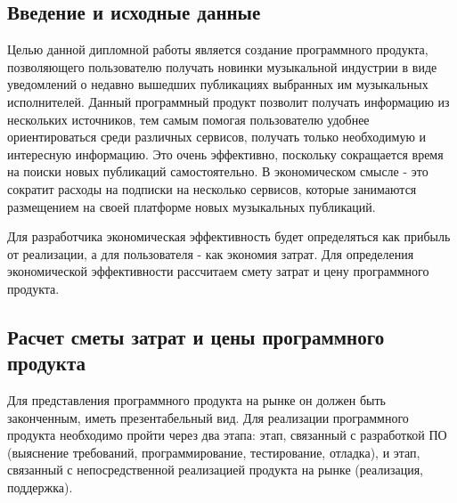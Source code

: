 
\subsection{Введение и исходные данные}

Целью данной дипломной работы является создание программного продукта, позволяющего пользователю получать новинки музыкальной индустрии в виде уведомлений о недавно вышедших публикациях выбранных им музыкальных исполнителей. Данный программный продукт позволит получать информацию из нескольких источников, тем самым помогая пользователю удобнее ориентироваться среди различных сервисов, получать только необходимую и интересную информацию. Это очень эффективно, поскольку сокращается время на поиски новых публикаций самостоятельно. В экономическом смысле - это сократит расходы на подписки на несколько сервисов, которые занимаются размещением на своей платформе новых музыкальных публикаций.

Для разработчика экономическая эффективность будет определяться как прибыль от реализации, а для пользователя - как экономия затрат. Для определения экономической эффективности рассчитаем смету затрат и цену программного продукта.

\subsection{Расчет сметы затрат и цены программного продукта}

Для представления программного продукта на рынке он должен быть законченным, иметь презентабельный вид. Для реализации программного продукта необходимо пройти через два этапа: этап, связанный с разработкой ПО (выяснение требований, программирование, тестирование, отладка), и этап, связанный с непосредственной реализацией продукта на рынке (реализация, поддержка).

